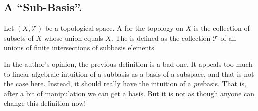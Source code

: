 \subsection{A ``Sub-Basis''.}
\begin{defn}\label{defn:subbasis}
Let $(X,\mathcal{T})$ be a topological space. A 
for the topology on $X$ is the collection of subsets of $X$ whose
union equals $X$. The  is
defined as the collection $\mathcal{T}$ of all unions of finite
intersections of subbasis elements.
\end{defn}
\begin{rmk}\label{rmk:subbasisAsBadDefn}
In the author's opinion, the previous definition is a bad one. It
appeals too much to linear algebraic intuition of a subbasis as a
basis of a subspace, and that is not the case here. Instead, it
should really have the intuition of a \emph{pre}basis. That is,
after a bit of manipulation we can get a basis. But it is not as
though anyone can change this definition now!
\end{rmk}
